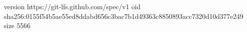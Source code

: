 version https://git-lfs.github.com/spec/v1
oid sha256:0155f54b5ae55ed8ddabd656c3bac7b1d49363c8850893acc7320d10d377e249
size 5566
